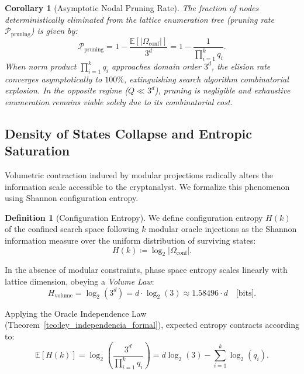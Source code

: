 \documentclass[11pt,a4paper]{article}
\theoremstyle{plain}
\newtheorem{corolario}[teorema]{Corollary}
\theoremstyle{definition}
\newtheorem{definicion}[teorema]{Definition}
\numberwithin{equation}{section}
\newcommand{\E}{\mathbb{E}}
\begin{document}
\begin{corolario}[Asymptotic Nodal Pruning Rate]
\label{cor:tasa_poda}
The fraction of nodes deterministically eliminated from the lattice enumeration tree (pruning rate $\mathcal{P}_{\text{pruning}}$) is given by:
\begin{equation}
\mathcal{P}_{\mathrm{pruning}} = 1 - \frac{\E[|\Omega_{\mathrm{conf}}|]}{3^d} = 1 - \frac{1}{\prod_{i=1}^k q_i}.
\end{equation}
When norm product $\prod_{i=1}^k q_i$ approaches domain order $3^d$, the elision rate converges asymptotically to $100\%$, extinguishing search algorithm combinatorial explosion. In the opposite regime ($Q \ll 3^d$), pruning is negligible and exhaustive enumeration remains viable solely due to its combinatorial cost.
\end{corolario}

\subsection{Density of States Collapse and Entropic Saturation}
\label{subsec:colapso_entropico}

Volumetric contraction induced by modular projections radically alters the information scale accessible to the cryptanalyst. We formalize this phenomenon using Shannon configuration entropy.

\begin{definicion}[Configuration Entropy]
\label{def:entropia_configuracion}
We define configuration entropy $H(k)$ of the confined search space following $k$ modular oracle injections as the Shannon information measure over the uniform distribution of surviving states:
\begin{equation}
H(k) \coloneqq \log_2 |\Omega_{\mathrm{conf}}|.
\end{equation}
\end{definicion}

In the absence of modular constraints, phase space entropy scales linearly with lattice dimension, obeying a \emph{Volume Law}:
\begin{equation}
H_{\text{volume}} = \log_2(3^d) = d \cdot \log_2(3) \approx 1.58496 \cdot d \quad \text{[bits]}.
\end{equation}

Applying the Oracle Independence Law (Theorem~\ref{teo:ley_independencia_formal}), expected entropy contracts according to:
\begin{equation}
\E[H(k)] = \log_2 \left( \frac{3^d}{\prod_{i=1}^k q_i} \right) = d \log_2(3) - \sum_{i=1}^k \log_2(q_i).
\end{equation}
\end{document}
